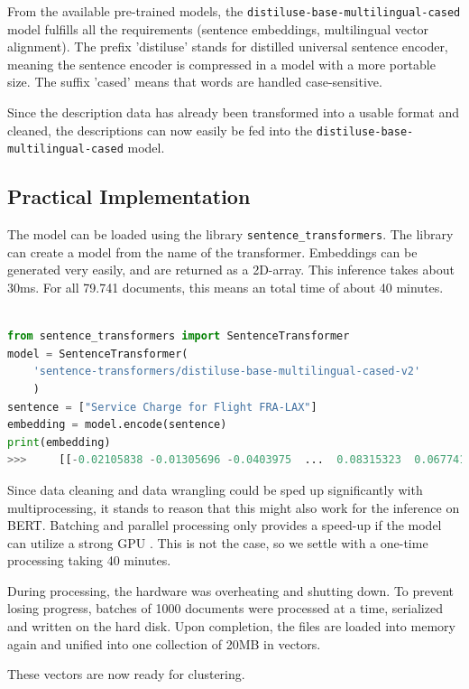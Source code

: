             From the available pre-trained models, the \lstinline|distiluse-base-multilingual-cased| model fulfills all the requirements (sentence embeddings, multilingual vector alignment). The prefix 'distiluse' stands for distilled universal sentence encoder, meaning the sentence encoder is compressed in a model with a more portable size. The suffix 'cased' means that words are handled case-sensitive.
            
            Since the description data has already been transformed into a usable format and cleaned, the descriptions can now easily be fed into the \lstinline|distiluse-base-multilingual-cased| model.
            	
            \subsection{Practical Implementation}
             
             The model can be loaded using the library \lstinline|sentence_transformers|. The library can create a model from the name of the transformer. Embeddings can be generated very easily, and are returned as a 2D-array. This inference takes about 30ms. For all 79.741 documents, this means an total time of about 40 minutes.
             
\begin{lstlisting}[language=python,
	label=code:generate-embed,
	caption=Generating an Embedding with BERT,
	style=EigenerPythonStyle]   

from sentence_transformers import SentenceTransformer
model = SentenceTransformer(
	'sentence-transformers/distiluse-base-multilingual-cased-v2'
	)
sentence = ["Service Charge for Flight FRA-LAX"]
embedding = model.encode(sentence)
print(embedding)
>>> 	[[-0.02105838 -0.01305696 -0.0403975  ...  0.08315323  0.06774105  0.03354893]
\end{lstlisting}

		Since data cleaning and data wrangling could be sped up significantly with multiprocessing, it stands to reason that this might also work for the inference on BERT. Batching and parallel processing only provides a speed-up if the model can utilize a strong \ac{GPU} \cite{schopfParallelInferenceHuggingFace2022}. This is not the case, so we settle with a one-time processing taking 40 minutes.
		
		During processing, the hardware was overheating and shutting down. To prevent losing progress, batches of 1000 documents were processed at a time, serialized and written on the hard disk. Upon completion, the files are loaded into memory again and unified into one collection of 20MB in vectors.

		These vectors are now ready for clustering.            